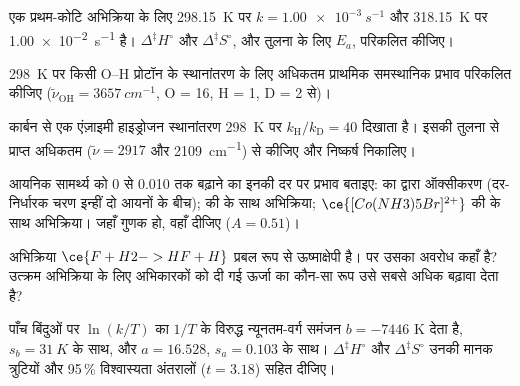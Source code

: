 \begin{exercise}[$\star\star$]\label{exo:b3:rate-theories:5}
एक प्रथम-कोटि अभिक्रिया के लिए \qty{298.15}{K} पर $k = \qty{1.00e-3}{s^{-1}}$ और
\qty{318.15}{K} पर \qty{1.00e-2}{s^{-1}} है। $\Delta^{\ddagger}H^\circ$ और $\Delta^{\ddagger}S^\circ$, और तुलना के लिए $E_a$, परिकलित कीजिए।
\end{exercise}

\begin{exercise}[$\star\star$]\label{exo:b3:rate-theories:6}
\qty{298}{K} पर किसी O--H प्रोटॉन के स्थानांतरण के लिए अधिकतम प्राथमिक समस्थानिक प्रभाव परिकलित कीजिए
($\tilde\nu_{\mathrm{OH}} = \qty{3657}{cm^{-1}}$,  O = 16, H = 1, D = 2 से)।
\end{exercise}

\begin{exercise}[$\star\star$]\label{exo:b3:rate-theories:7}
कार्बन से एक एंज़ाइमी हाइड्रोजन स्थानांतरण \qty{298}{K} पर $k_{\mathrm H}/k_{\mathrm D} = 40$ दिखाता है। इसकी तुलना
 से प्राप्त अधिकतम ($\tilde\nu = 2917$ और \qty{2109}{cm^{-1}}) से कीजिए और निष्कर्ष निकालिए।
\end{exercise}

\begin{exercise}[$\star\star$]\label{exo:b3:rate-theories:8}
आयनिक सामर्थ्य को 0 से 0.010 तक बढ़ाने का इनकी दर पर प्रभाव
बताइए:  का  द्वारा ऑक्सीकरण (दर-निर्धारक चरण इन्हीं दो आयनों के बीच);
 की  के साथ अभिक्रिया; $\ce{[Co(NH3)5Br]^{2+}}$ की  के साथ अभिक्रिया।
जहाँ गुणक हो, वहाँ दीजिए ($A = 0.51$)।
\end{exercise}

\begin{exercise}[$\star\star$]\label{exo:b3:rate-theories:9}
अभिक्रिया $\ce{F + H2 -> HF + H}$ प्रबल रूप से ऊष्माक्षेपी है।  पर उसका अवरोध
कहाँ है? उत्क्रम अभिक्रिया के लिए अभिकारकों को दी गई ऊर्जा का कौन-सा रूप
उसे सबसे अधिक बढ़ावा देता है?
\end{exercise}

\begin{exercise}[$\star\star\star$]\label{exo:b3:rate-theories:10}
पाँच बिंदुओं पर $\ln(k/T)$ का $1/T$ के विरुद्ध न्यूनतम-वर्ग समंजन $b = -7446$ K देता है,
$s_b = \qty{31}{K}$ के साथ, और $a = 16.528$, $s_a = 0.103$ के साथ। $\Delta^{\ddagger}H^\circ$ और $\Delta^{\ddagger}S^\circ$
उनकी मानक त्रुटियों और 95\,\% विश्वास्यता अंतरालों ($t = 3.18$) सहित दीजिए।
\end{exercise}

